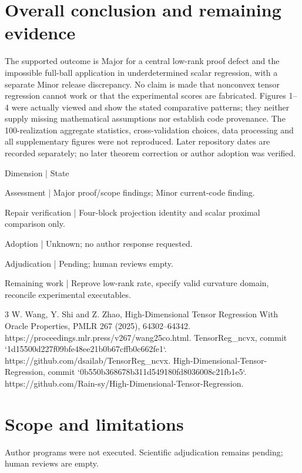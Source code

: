 \documentclass[10pt]{article}
\begin{document}
\section*{Overall conclusion and remaining evidence}
The supported outcome is Major for a central low-rank proof defect and the impossible full-ball application in underdetermined scalar regression, with a separate Minor release discrepancy. No claim is made that nonconvex tensor regression cannot work or that the experimental scores are fabricated. Figures 1–4 were actually viewed and show the stated comparative patterns; they neither supply missing mathematical assumptions nor establish code provenance. The 100-realization aggregate statistics, cross-validation choices, data processing and all supplementary figures were not reproduced. Later repository dates are recorded separately; no later theorem correction or author adoption was verified.\par
Dimension | State\par
Assessment | Major proof/scope findings; Minor current-code finding.\par
Repair verification | Four-block projection identity and scalar proximal comparison only.\par
Adoption | Unknown; no author response requested.\par
Adjudication | Pending; human reviews empty.\par
Remaining work | Reprove low-rank rate, specify valid curvature domain, reconcile experimental executables.\par
3 W. Wang, Y. Shi and Z. Zhao, High-Dimensional Tensor Regression With Oracle Properties, PMLR 267 (2025), 64302–64342. https://proceedings.mlr.press/v267/wang25co.html. TensorReg\_ncvx, commit `1d15500d227f09bfe48ee21b0b67cffb0c662fe1`. https://github.com/dsailab/TensorReg\_ncvx. High-Dimensional-Tensor-Regression, commit `0b550b368678b311d549180fd8036008c21fb1e5`. https://github.com/Rain-sy/High-Dimensional-Tensor-Regression.\par
\section*{Scope and limitations}
Author programs were not executed. Scientific adjudication remains pending; human reviews are empty.\par
\end{document}
